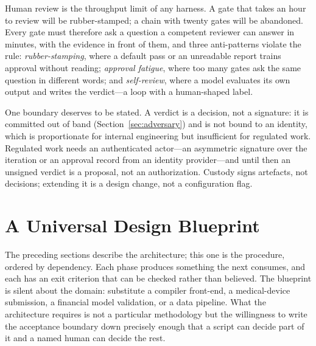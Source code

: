 \documentclass[10pt,a4paper]{article}
\theoremstyle{definition}
\theoremstyle{plain}
\theoremstyle{principle}
\begin{document}
Human review is the throughput limit of any harness. A gate that takes an hour to review will be
rubber-stamped; a chain with twenty gates will be abandoned. Every gate must therefore ask a
question a competent reviewer can answer in minutes, with the evidence in front of them, and three
anti-patterns violate the rule: \emph{rubber-stamping}, where a default pass or an unreadable
report trains approval without reading; \emph{approval fatigue}, where too many gates ask the same
question in different words; and \emph{self-review}, where a model evaluates its own output and
writes the verdict---a loop with a human-shaped label.

One boundary deserves to be stated. A verdict is a decision, not a signature: it is committed out
of band (Section~\ref{sec:adversary}) and is not bound to an identity, which is proportionate for
internal engineering but insufficient for regulated work. Regulated work needs an authenticated actor---an asymmetric signature over the
iteration or an approval record from an identity provider---and until then an unsigned verdict is a
proposal, not an authorization. Custody signs artefacts, not decisions; extending it is a design
change, not a configuration flag.

\section{A Universal Design Blueprint}\label{sec:blueprint}

The preceding sections describe the architecture; this one is the procedure, ordered by
dependency. Each phase produces something the next consumes, and each has an exit criterion that
can be checked rather than believed. The blueprint is silent about the domain: substitute a compiler
front-end, a medical-device submission, a financial model validation, or a data pipeline. What the
architecture requires is not a particular methodology but the willingness to write the acceptance
boundary down precisely enough that a script can decide part of it and a named human can decide the
rest.
\end{document}
